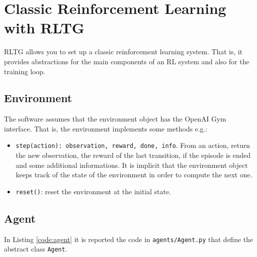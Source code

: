 \section{Classic Reinforcement Learning with RLTG}
RLTG allows you to set up a classic reinforcement learning system. That is, it provides abstractions for the main components of an RL system and also for the training loop.

\subsection{Environment}
The software assumes that the environment object has the OpenAI Gym interface. That is, the environment implements some methods e.g.:
\begin{itemize}
	\item \texttt{step(action): observation, reward, done, info}. From an action, return the new observation, the reward of the last transition, if the episode is ended and some additional informations. It is implicit that the environment object keeps track of the state of the environment in order to compute the next one.
	\item \texttt{reset()}: reset the environment at the initial state.
\end{itemize}

\subsection{Agent}
In Listing \ref{code:agent} it is reported the code in \texttt{agents/Agent.py} that define the abstract class \texttt{Agent}.

